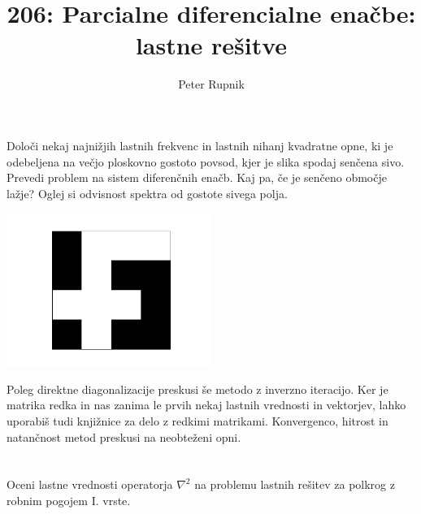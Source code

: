 \documentclass[a4paper,oneside,12pt]{article}
\title{206: Parcialne diferencialne enačbe: lastne rešitve}
\author{Peter Rupnik}
\begin{document}
\maketitle
\section{}

Določi nekaj najnižjih lastnih frekvenc in lastnih nihanj kvadratne opne, ki je odebeljena na večjo ploskovno gostoto povsod, kjer je slika spodaj senčena sivo. Prevedi problem na sistem diferenčnih enačb. Kaj pa, če je senčeno območje lažje? Oglej si odvisnost spektra od gostote sivega polja.
\begin{center}
    \includegraphics[width=0.5\textwidth]{../old/1-figura.pdf}
\end{center}
Poleg direktne diagonalizacije preskusi še metodo z inverzno iteracijo. Ker je matrika redka in nas zanima le prvih nekaj lastnih vrednosti in vektorjev, lahko uporabiš tudi knjižnice za delo z redkimi matrikami.
Konvergenco, hitrost in natančnost metod preskusi na neobteženi opni.



\section{}
Oceni lastne vrednosti operatorja $\nabla^{2}$ na problemu lastnih rešitev za polkrog z robnim pogojem
I. vrste.


\end{document}
